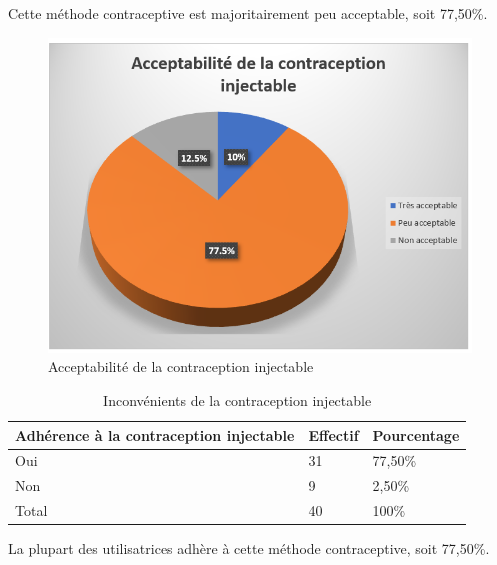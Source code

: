 \noindent Cette méthode contraceptive est majoritairement peu acceptable, soit 77,50\%. 

\begin{figure}[H]
  \centering
  \includegraphics[scale=1]{Images/fig_52.png}
  \caption{Acceptabilité de la contraception injectable}
   
\end{figure}

\begin{table}[H]
  \centering
  \renewcommand{\arraystretch}{1.5}
  \caption{Inconvénients de la contraception injectable}
  \begin{spacing}{1.5} %
  \begin{tabularx}{\textwidth}{|p{8cm}|X|X|}
      \hline
      \rowcolor{customcolor}
      \textbf{\color{white}Adhérence à la contraception injectable} & \textbf{\color{white}Effectif} & \textbf{\color{white}Pourcentage}  \\
      \hline
       Oui & 31 & 77,50\% \\
      \hline
      Non  & 9 & 2,50\% \\
      \hline  
      Total & 40 & 100\% \\
      
      \hline
  \end{tabularx}
\end{spacing}

\end{table}

\noindent La plupart des utilisatrices adhère à cette méthode contraceptive, soit 77,50\%. 

